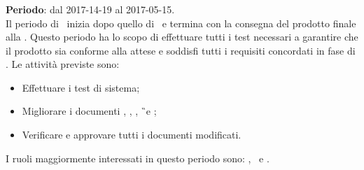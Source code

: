 		\subsubsection{\VV}
		\textbf{Periodo}: dal 2017-14-19 al 2017-05-15.\\
		Il periodo di \VV\ inizia dopo quello di \CO\ e termina con la consegna del prodotto finale alla \RA. Questo periodo ha lo scopo di effettuare tutti i test necessari a garantire che il prodotto sia conforme alla attese e soddisfi tutti i requisiti concordati in fase di \AdR. Le attività previste sono:
		\begin{itemize}
			\item Effettuare i test di sistema;
			\item Migliorare i documenti \NdP, \PdP, \PdQ, \G\ e \MU;
			\item Verificare e approvare tutti i documenti modificati.
		\end{itemize}
			I ruoli maggiormente interessati in questo periodo sono: \Res, \Prog\ e \Ver.